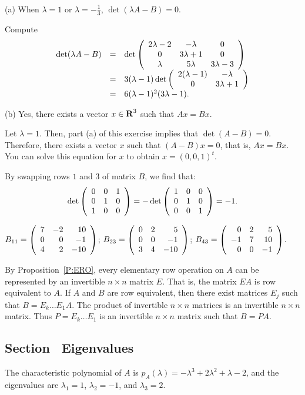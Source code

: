 (a) \ans When $\lambda = 1$ or $\lambda = -\frac{1}{3}$,
$\det(\lambda A - B) = 0$.

\soln Compute
\[
\begin{array}{rcl}
\det(\lambda A - B) & = & \det\left(\begin{array}{ccc} 2\lambda - 2 & -\lambda & 0 \\ 0 & 3\lambda + 1 & 0 \\ \lambda & 5\lambda & 3\lambda - 3\end{array}\right) \\
& = & 3(\lambda - 1)\det\left(\begin{array}{cc} 2(\lambda - 1) & -\lambda\\ 0 &3\lambda + 1\end{array}\right) \\
& = & 6(\lambda - 1)^2(3\lambda - 1).
\end{array}
\]

(b) \ans Yes, there exists a vector $x \in \mbox{$\bf{R}$}^3$ such that $Ax = Bx$.

\soln Let $\lambda = 1$.  Then, part (a) of this exercise implies that
$\det(A - B) = 0$.  Therefore, there exists a vector $x$ such that
$(A - B)x = 0$, that is, $Ax = Bx$.  You can solve this equation for $x$
to obtain $x = (0,0,1)^t$.

By swapping rows $1$ and $3$ of matrix $B$, we find that:
\[
\det\left(\begin{array}{rrr} 0 & 0 & 1 \\ 0 & 1 & 0 \\ 1 & 0 & 0\end{array}\right) =
-\det\left(\begin{array}{rrr} 1 & 0 & 0 \\ 0 & 1 & 0 \\ 0 & 0 & 1\end{array}\right) = -1.
\]

$B_{11} = \left(\begin{array}{rrr} 7 & -2 & 10 \\ 0 & 0 & -1 \\ 4 & 2 & -10\end{array}\right)$;
$B_{23} = \left(\begin{array}{rrr} 0 & 2 & 5 \\ 0 & 0 & -1 \\ 3 & 4 & -10\end{array}\right)$;
$B_{43} = \left(\begin{array}{rrr} 0 & 2 & 5 \\ -1 & 7 & 10 \\ 0 & 0 & -1\end{array}\right)$.

By Proposition~\ref{P:ERO}, every
elementary row operation on $A$ can be represented by an invertible $n
\times n$ matrix $E$.  That is, the matrix $EA$ is row equivalent to
$A$.  If $A$ and $B$ are row equivalent, then there exist matrices
$E_j$ such that $B = E_k\ldots E_1A$.  The product of invertible $n
\times n$ matrices is an invertible $n \times n$ matrix.  Thus $P =
E_k\ldots E_1$ is an invertible $n \times n$ matrix such that $B =
PA$.



\subsection*{Section~\protect{\ref{S:eig}} Eigenvalues}

\ans The characteristic polynomial of $A$ is $p_A(\lambda) =
-\lambda^3 + 2\lambda^2 + \lambda - 2$, and the eigenvalues are
$\lambda_1 = 1$, $\lambda_2 = -1$, and $\lambda_3 = 2$.

